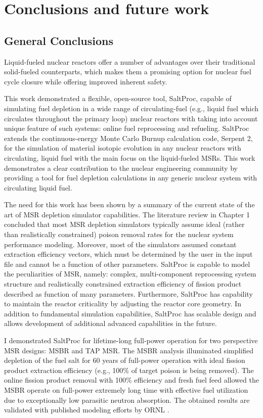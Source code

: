 \chapter{Conclusions and future work}

\section{General Conclusions}
Liquid-fueled nuclear reactors offer a number of advantages over their 
traditional solid-fueled counterparts, which makes them a promising option for 
nuclear fuel cycle closure while offering improved inherent safety.

This work demonstrated a flexible, open-source tool, SaltProc, capable of 
simulating fuel depletion in a wide range of circulating-fuel (e.g., liquid 
fuel which circulates throughout the primary loop) nuclear reactors with 
taking into account unique feature of such systems: online fuel reprocessing 
and refueling. SaltProc extends the continuous-energy Monte Carlo Burnup 
calculation code, Serpent 2, for the simulation of material
isotopic evolution 
in any nuclear reactors with circulating, liquid fuel with the main focus on 
the liquid-fueled \glspl{MSR}. This work demonstrates a clear contribution to 
the nuclear engineering community by providing a tool for fuel depletion 
calculations in any generic nuclear system with circulating liquid fuel.

The need for this work has been shown by a summary of the current state of the 
art of \gls{MSR} depletion simulator capabilities. The literature review in 
Chapter 1 concluded that most \gls{MSR} depletion simulators typically assume 
ideal (rather than realistically constrained) poison removal rates for the 
nuclear system performance modeling. Moreover, most of the simulators assumed 
constant extraction efficiency vectors, which must be determined by the user 
in the input file and cannot be a function of other parameters. SaltProc is 
capable to model the peculiarities of \gls{MSR}, namely:
complex, multi-component reprocessing system structure and realistically 
constrained extraction efficiency of fission product described as function of 
many parameters. Furthermore, SaltProc has capability to maintain the reactor 
criticality by adjusting the reactor core geometry. In addition to fundamental 
simulation capabilities, SaltProc has scalable design and allows development 
of additional advanced capabilities in the future.

I demonstrated SaltProc for lifetime-long full-power operation 
for two perspective \gls{MSR} designs: \gls{MSBR} and \gls{TAP} \gls{MSR}. The 
\gls{MSBR} analysis illuminated simplified depletion of the fuel salt for 60 
years of full-power operation with ideal fission product extraction efficiency
(e.g., 100\% of target poison is being removed). The online fission product 
removal with 100\% efficiency and fresh fuel feed allowed the \gls{MSBR} 
operate on full-power extremely long time with effective fuel utilization due 
to exceptionally low parasitic neutron absorption. The obtained results are 
validated with published modeling efforts by \gls{ORNL} 
\cite{betzler_molten_2017}.

